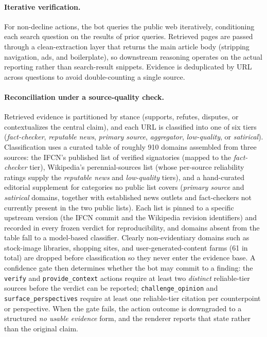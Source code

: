 \paragraph{Iterative verification.} For non-decline actions, the bot queries the public web iteratively, conditioning each search question on the results of prior queries. Retrieved pages are passed through a clean-extraction layer that returns the main article body (stripping navigation, ads, and boilerplate), so downstream reasoning operates on the actual reporting rather than search-result snippets. Evidence is deduplicated by URL across questions to avoid double-counting a single source.

\paragraph{Reconciliation under a source-quality check.} Retrieved evidence is partitioned by stance (supports, refutes, disputes, or contextualizes the central claim), and each URL is classified into one of six tiers (\textit{fact-checker}, \textit{reputable news}, \textit{primary source}, \textit{aggregator}, \textit{low-quality}, or \textit{satirical}). Classification uses a curated table of roughly 910 domains assembled from three sources: the IFCN's published list of verified signatories (mapped to the \textit{fact-checker} tier), Wikipedia's perennial-sources list (whose per-source reliability ratings supply the \textit{reputable news} and \textit{low-quality} tiers), and a hand-curated editorial supplement for categories no public list covers (\textit{primary source} and \textit{satirical} domains, together with established news outlets and fact-checkers not currently present in the two public lists). Each list is pinned to a specific upstream version (the IFCN commit and the Wikipedia revision identifiers) and recorded in every frozen verdict for reproducibility, and domains absent from the table fall to a model-based classifier. Clearly non-evidentiary domains such as stock-image libraries, shopping sites, and user-generated-content farms (61 in total) are dropped before classification so they never enter the evidence base. A confidence gate then determines whether the bot may commit to a finding: the \texttt{verify} and \texttt{provide\_context} actions require at least two \textit{distinct} reliable-tier sources before the verdict can be reported; \texttt{challenge\_opinion} and \texttt{surface\_perspectives} require at least one reliable-tier citation per counterpoint or perspective. When the gate fails, the action outcome is downgraded to a structured \textit{no usable evidence} form, and the renderer reports that state rather than the original claim.


